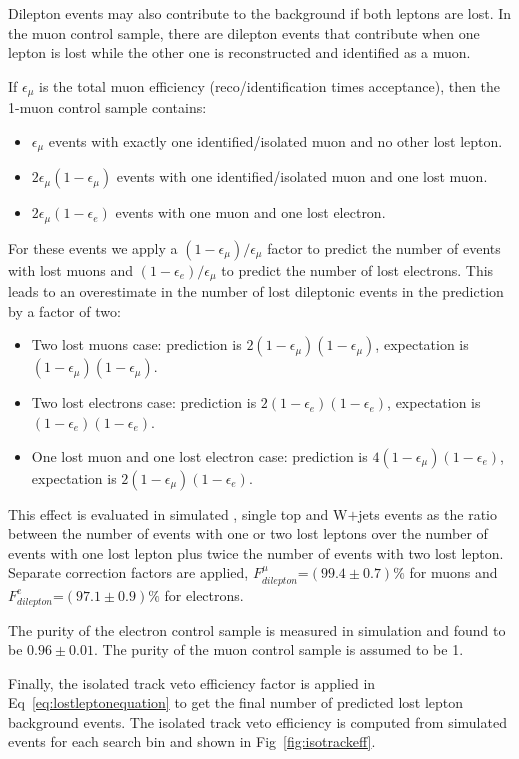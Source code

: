 Dilepton events may also contribute to the background if both leptons are lost.
In the muon control sample, there are dilepton events that contribute 
when one lepton is lost while the other one is reconstructed and
identified as a muon.

If $\epsilon_{\mu}$ is the total muon efficiency 
(reco/identification times acceptance), then the 1-muon control sample contains:
\begin{itemize}
\item $\epsilon_{\mu}$ events with exactly one identified/isolated muon and 
no other lost lepton.
\item $2\epsilon_{\mu}(1-\epsilon_{\mu})$ events with one identified/isolated 
muon and one lost muon.
\item $2\epsilon_{\mu}(1-\epsilon_{e})$ events with one muon and one 
lost electron.
\end{itemize}
For these events we apply a $(1-\epsilon_{\mu})/\epsilon_{\mu}$ factor to
predict the number of events with  
lost muons and  $(1-\epsilon_{e})/\epsilon_{\mu}$ to predict the
number of lost electrons.
This leads to an overestimate in the number of lost dileptonic events in the 
prediction by a factor of two:
\begin{itemize}
\item Two lost muons case: prediction is 
$2(1-\epsilon_{\mu})(1-\epsilon_{\mu})$, expectation 
is $(1-\epsilon_{\mu})(1-\epsilon_{\mu})$.
\item Two lost electrons case: prediction is 
$2(1-\epsilon_{e})(1-\epsilon_{e})$, 
expectation is $(1-\epsilon_{e})(1-\epsilon_{e})$.
\item One lost muon and one lost electron case: prediction is
$4(1-\epsilon_{\mu})(1-\epsilon_{e})$, 
expectation is $2(1-\epsilon_{\mu})(1-\epsilon_{e})$.
\end{itemize}
This effect is evaluated in  
simulated \ttbar, single top and W$+$jets events as the ratio between the number of events 
with one or two lost leptons over the number of events with one lost 
lepton plus twice the number of events with two lost lepton. 
Separate correction factors are applied,  
$F_{dilepton}^{\mu}$=$ (99.4\pm0.7)\% $ for muons and 
$F_{dilepton}^{e}$=$ (97.1\pm0.9)\% $ for electrons.

The purity of the electron control sample is measured in simulation and found to be $0.96\pm0.01$. The purity of the muon control sample is assumed to be 1.

Finally, the isolated track veto efficiency factor is applied in 
Eq~\ref{eq:lostleptonequation}
to get the final number of predicted lost lepton background events.
The isolated track veto efficiency is computed from simulated events 
for each search bin and shown in Fig~\ref{fig:isotrackeff}.

